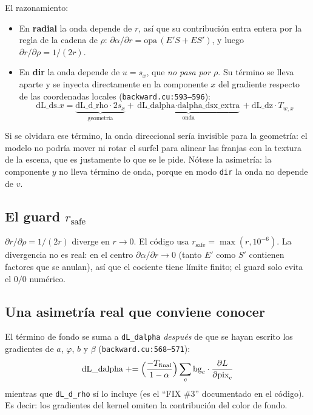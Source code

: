 \documentclass[12pt]{extarticle}
\newcommand{\code}[1]{\texttt{#1}}
\begin{document}
El razonamiento:

\begin{itemize}
\item En \textbf{radial} la onda depende de $r$, así que su contribución entra
      entera por la regla de la cadena de $\rho$:
      $\partial\alpha/\partial r = \text{opa}\,(E'S+ES')$, y luego
      $\partial r/\partial\rho = 1/(2r)$.
\item En \textbf{dir} la onda depende de $u=s_x$, que \emph{no pasa por
      $\rho$}. Su término se lleva aparte y se inyecta directamente en la
      componente $x$ del gradiente respecto de las coordenadas locales
      (\code{backward.cu:593--596}):
      \[
      \text{dL\_ds}.x = \underbrace{\text{dL\_d\_rho}\cdot 2 s_x}_{\text{geometría}}
      + \underbrace{\text{dL\_dalpha}\cdot\text{dalpha\_dsx\_extra}}_{\text{onda}}
      + \text{dL\_dz}\cdot T_{w,x}
      \]
\end{itemize}

Si se olvidara ese término, la onda direccional sería invisible para la
geometría: el modelo no podría mover ni rotar el surfel para alinear las
franjas con la textura de la escena, que es justamente lo que se le pide.
Nótese la asimetría: la componente $y$ no lleva término de onda, porque en modo
\code{dir} la onda no depende de $v$.

\subsection{El guard $r_{\text{safe}}$}

$\partial r/\partial\rho = 1/(2r)$ diverge en $r\to0$. El código usa
$r_{\text{safe}}=\max(r,10^{-6})$. La divergencia no es real: en el centro
$\partial\alpha/\partial r\to0$ (tanto $E'$ como $S'$ contienen factores que se
anulan), así que el cociente tiene límite finito; el guard solo evita el
$0/0$ numérico.

\subsection{Una asimetría real que conviene conocer}

El término de fondo se suma a \code{dL\_dalpha} \emph{después} de que se hayan
escrito los gradientes de $a$, $\varphi$, $b$ y $\beta$
(\code{backward.cu:568--571}):
\[
\text{dL\_dalpha} \mathrel{+}= \Bigl(\frac{-T_{\text{final}}}{1-\alpha}\Bigr)
\sum_c \text{bg}_c\cdot \frac{\partial L}{\partial \text{pix}_c}
\]
mientras que \code{dL\_d\_rho} sí lo incluye (es el ``FIX \#3'' documentado en
el código). Es decir: los gradientes del kernel omiten la contribución del
color de fondo.
\end{document}
